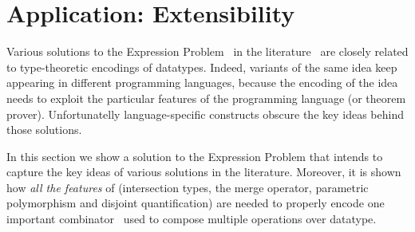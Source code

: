 \begin{comment}
With this tool in hand, we can rewrite the program above to:
\[
\blam {\alpha \disjoint \tyint} {\lam x {\alpha \inter \tyint} x}
\]

This program typechecks because while $x$ is of type $\alpha \inter \tyint$,
and $\alpha$ is disjoint with $\tyint$. Similarly, in the new system,
the original program no longer typechecks, thus preventing overlapping types.
\end{comment}

\section{Application: Extensibility}
\label{subsec:OAs}

Various solutions to the Expression
Problem~\cite{wadler1998expression} in the 
literature~\cite{Swierstra:2008,finally-tagless,oliveira09modular,DelawareOS13}
are closely related to type-theoretic encodings of datatypes. Indeed, variants 
of the same idea keep appearing in different programming languages,
because the encoding of the idea needs to exploit the particular
features of the programming language (or theorem prover). 
Unfortunatelly language-specific constructs obscure the key ideas
behind those solutions. 

In this section we show a solution to the
Expression Problem that intends to capture the key ideas of various
solutions in the literature. Moreover, it is shown how \emph{all the
  features} of \name (intersection types, the merge operator,
parametric polymorphism and disjoint quantification) are needed to
properly encode one important combinator~\cite{oliveira2013feature} used to compose
multiple operations over datatype.

\begin{comment}
The combination of parametric polymorphism, intersection types and the
merge operator is useful to encode datatypes with subtyping and
support extensibility in \name. The combination of
polymorphism and the merge operator is essential to allow the
composition of multiple operations over datatypes. 
In the following
we present a step-by-step solution to the Expression Problem in \name,
and illustrate how to combine multiple operations.
\end{comment}

